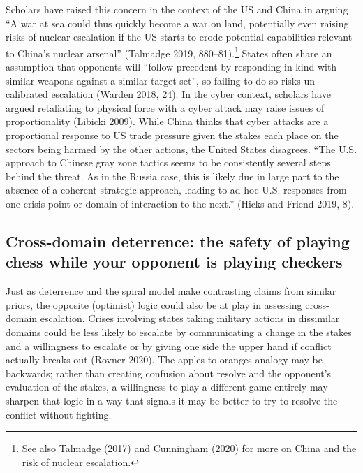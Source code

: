 \documentclass[
]{article}
\begin{document}
Scholars have raised this concern in the context of the US and China in arguing ``A war at sea could thus quickly become a war on land, potentially even raising risks of nuclear escalation if the US starts to erode potential capabilities relevant to China's nuclear arsenal'' (Talmadge 2019, 880--81).\footnote{See also Talmadge (2017) and Cunningham (2020) for more on China and the risk of nuclear escalation.} States often share an assumption that opponents will ``follow precedent by responding in kind with similar weapons against a similar target set'', so failing to do so risks un-calibrated escalation (Warden 2018, 24). In the cyber context, scholars have argued retaliating to physical force with a cyber attack may raise issues of proportionality (Libicki 2009). While China thinks that cyber attacks are a proportional response to US trade pressure given the stakes each place on the sectors being harmed by the other actions, the United States disagrees. ``The U.S. approach to Chinese gray zone tactics seems to be consistently several steps behind the threat. As in the Russia case, this is likely due in large part to the absence of a coherent strategic approach, leading to ad hoc U.S. responses from one crisis point or domain of interaction to the next.'' (Hicks and Friend 2019, 8).

\hypertarget{cross-domain-deterrence-the-safety-of-playing-chess-while-your-opponent-is-playing-checkers}{%
\subsection{Cross-domain deterrence: the safety of playing chess while your opponent is playing checkers}\label{cross-domain-deterrence-the-safety-of-playing-chess-while-your-opponent-is-playing-checkers}}

Just as deterrence and the spiral model make contrasting claims from similar priors, the opposite (optimist) logic could also be at play in assessing cross-domain escalation. Crises involving states taking military actions in dissimilar domains could be less likely to escalate by communicating a change in the stakes and a willingness to escalate or by giving one side the upper hand if conflict actually breaks out (Rovner 2020). The apples to oranges analogy may be backwards; rather than creating confusion about resolve and the opponent's evaluation of the stakes, a willingness to play a different game entirely may sharpen that logic in a way that signals it may be better to try to resolve the conflict without fighting.
\end{document}
